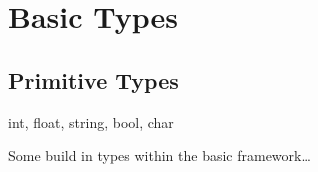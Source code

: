 \section{Basic Types}

\subsection{Primitive Types}
int, float, string, bool, char


Some build in types within the basic framework\ldots

